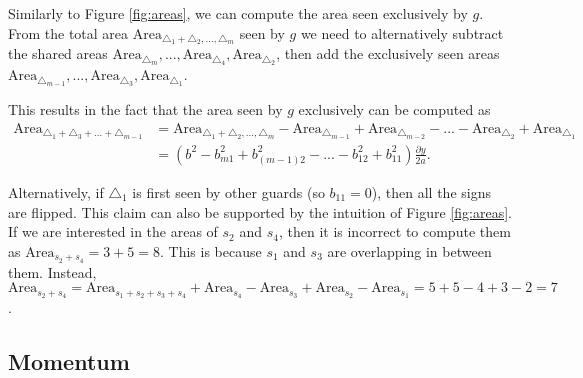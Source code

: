 Similarly to Figure \ref{fig:areas}, we can compute the area seen exclusively by $g$. From the total area $\text{Area}_{\triangle_1 + \triangle_2, ..., \triangle_m}$ seen by $g$ we need to alternatively subtract the shared areas $\text{Area}_{\triangle_m}, ..., \text{Area}_{\triangle_4}, \text{Area}_{\triangle_2}$, then add the exclusively seen areas $\text{Area}_{\triangle_{m - 1}}, ..., \text{Area}_{\triangle_3}, \text{Area}_{\triangle_1}$.


This results in the fact that the area seen by $g$ exclusively can be computed as 
\begin{align*}
    \text{Area}_{\triangle_1 + \triangle_3 + ... + \triangle_{m - 1}} &= \text{Area}_{\triangle_1 + \triangle_2, ..., \triangle_m} - \text{Area}_{\triangle_{m - 1}} + \text{Area}_{\triangle_{m - 2}} - ... - \text{Area}_{\triangle_2} + \text{Area}_{\triangle_1} \\
                                                                      &= \left(b^2 - b_{m1}^2 + b_{(m - 1)2}^2 - ... - b_{12}^2 + b_{11}^2\right)\frac{\partial y}{2a}.
\end{align*}

Alternatively, if $\triangle_1$ is first seen by other guards (so $b_{11} = 0$), then all the signs are flipped. This claim can also be supported by the intuition of Figure \ref{fig:areas}. If we are interested in the areas of $s_2$ and $s_4$, then it is incorrect to compute them as $\text{Area}_{s_2 + s_4} = 3 + 5 = 8$. This is because $s_1$ and $s_3$ are overlapping in between them.  Instead, $\text{Area}_{s_2 + s_4} = \text{Area}_{s_1 + s_2 + s_3 + s_4} + \text{Area}_{s_4} - \text{Area}_{s_3} + \text{Area}_{s_2} - \text{Area}_{s_1} = 5 + 5 - 4 + 3 - 2 = 7$.

\subsection{Momentum}
\label{sec:momentum}

